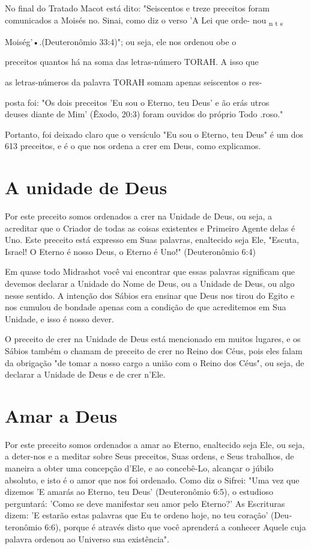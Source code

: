 \begin{itemize}
\begin{enumrate}
\begin{itemize}
No final do Tratado Macot está dito: "Seiscentos e treze preceitos
foram comunicados a Moisés no. Sinai, como diz o verso 'A Lei que orde-
nou \textsubscript{n t s}


Moiség'•.(Deuteronômio 33:4)"; ou seja, ele nos
ordenou obe o


preceitos quantos há na soma das letras-número TORAH. A isso que

as letras-números da palavra TORAH somam apenas seiscentos o res-

posta foi: "Os dois preceitos 'Eu sou o Eterno, teu Deus' e ão erás
utros\\
deuses diante de Mim' (Êxodo, 20:3) foram ouvidos do próprio Todo
.roso."

Portanto, foi deixado claro que o versículo "Eu sou o Eterno, teu Deus"
é um dos 613 preceitos, e é o que nos ordena a crer em Deus, como
explicamos.

\section{A unidade de Deus}

Por este preceito somos ordenados a crer na Unidade de Deus, ou seja, a
acreditar que o Criador de todas as coisas existentes e Primeiro Agente
delas é Uno. Este preceito está expresso em Suas palavras, enaltecido
seja Ele, "Escuta, Israel! O Eterno é nosso Deus, o Eterno é Uno!"
(Deuteronômio 6:4)

Em quase todo Midrashot você vai encontrar que essas palavras
sig­nificam que devemos declarar a Unidade do Nome de Deus, ou a Unidade
de Deus, ou algo nesse sentido. A intenção dos Sábios era ensinar que
Deus nos tirou do Egito e nos cumulou de bondade apenas com a condição
de que acre­ditemos em Sua Unidade, e isso é nosso dever.

O preceito de crer na Unidade de Deus está mencionado em muitos lugares,
e os Sábios também o chamam de preceito de crer no Reino dos Céus,
pois eles falam da obrigação "de tomar a nosso cargo a união com o Reino
dos Céus", ou seja, de declarar a Unidade de Deus e de crer n'Ele.

\section{Amar a Deus}

Por este preceito somos ordenados a amar ao Eterno, enaltecido se­ja
Ele, ou seja, a deter-nos e a meditar sobre Seus preceitos, Suas ordens,
e Seus trabalhos, de maneira a obter uma concepção d'Ele, e ao
concebê-Lo, alcançar o júbilo absoluto, e isto é o amor que nos foi
ordenado. Como diz o Sifrei: "Uma vez que dizemos 'E amarás ao Eterno,
teu Deus' (Deuteronômio 6:5), o estu­dioso perguntará: 'Como se deve
manifestar seu amor pelo Eterno?' As Escritu­ras dizem: 'E estarão estas
palavras que Eu te ordeno hoje, no teu coração' (Deu­teronômio 6:6),
porque é através disto que você aprenderá a conhecer Aquele cuja palavra
ordenou ao Universo sua existência".


\end{itemize}
\end{enumrate}
\end{itemize}
